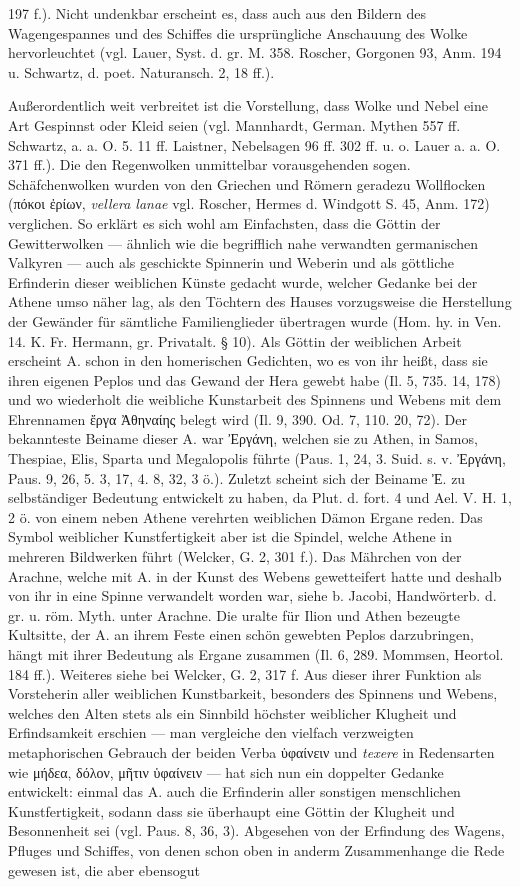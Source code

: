 \documentclass[a4paper, 11pt, oneside]{article}
\begin{document}
197 f.). Nicht undenkbar erscheint es, dass auch aus den Bildern des Wagengespannes und des Schiffes die ursprüngliche Anschauung des Wolke hervorleuchtet (vgl. Lauer, Syst. d. gr. M. 358. Roscher, Gorgonen 93, Anm. 194 u. Schwartz, d. poet. Naturansch. 2, 18 ff.).

Außerordentlich weit verbreitet ist die Vorstellung, dass Wolke und Nebel eine Art Gespinnst oder Kleid seien (vgl. Mannhardt, German. Mythen 557 ff. Schwartz, a. a. O. 5. 11 ff. Laistner, Nebelsagen 96 ff. 302 ff. u. o. Lauer a. a. O. 371 ff.). Die den Regenwolken unmittelbar vorausgehenden sogen. Schäfchenwolken wurden von den Griechen und Römern geradezu Wollflocken (πόκοι ἐρίων, \emph{vellera lanae} vgl. Roscher, Hermes d. Windgott S. 45, Anm. 172) verglichen. So erklärt es sich wohl am Einfachsten, dass die Göttin der Gewitterwolken --- ähnlich wie die begrifflich nahe verwandten germanischen Valkyren --- auch als geschickte Spinnerin und Weberin und als göttliche Erfinderin dieser weiblichen Künste gedacht wurde, welcher Gedanke bei der Athene umso näher lag, als den Töchtern des Hauses vorzugsweise die Herstellung der Gewänder für sämtliche Familienglieder übertragen wurde (Hom. hy. in Ven. 14. K. Fr. Hermann, gr. Privatalt. § 10). Als Göttin der weiblichen Arbeit erscheint A. schon in den homerischen Gedichten, wo es von ihr heißt, dass sie ihren eigenen Peplos und das Gewand der Hera gewebt habe (Il. 5, 735. 14, 178) und wo wiederholt die weibliche Kunstarbeit des Spinnens und Webens mit dem Ehrennamen ἔργα Ἀθηναίης belegt wird (Il. 9, 390. Od. 7, 110. 20, 72). Der bekannteste Beiname dieser A. war Ἐργάνη, welchen sie zu Athen, in Samos, Thespiae, Elis, Sparta und Megalopolis führte (Paus. 1, 24, 3. Suid. s. v. Ἐργάνη, Paus. 9, 26, 5. 3, 17, 4. 8, 32, 3 ö.). Zuletzt scheint sich der Beiname Ἐ. zu selbständiger Bedeutung entwickelt zu haben, da Plut. d. fort. 4 und Ael. V. H. 1, 2 ö. von einem neben Athene verehrten weiblichen Dämon Ergane reden. Das Symbol weiblicher Kunstfertigkeit aber ist die Spindel, welche Athene in mehreren Bildwerken führt (Welcker, G. 2, 301 f.). Das Mährchen von der Arachne, welche mit A. in der Kunst des Webens gewetteifert hatte und deshalb von ihr in eine Spinne verwandelt worden war, siehe b. Jacobi, Handwörterb. d. gr. u. röm. Myth. unter Arachne. Die uralte für Ilion und Athen bezeugte Kultsitte, der A. an ihrem Feste einen schön gewebten Peplos darzubringen, hängt mit ihrer Bedeutung als Ergane zusammen (Il. 6, 289. Mommsen, Heortol. 184 ff.). Weiteres siehe bei Welcker, G. 2, 317 f. Aus dieser ihrer Funktion als Vorsteherin aller weiblichen Kunstbarkeit, besonders des Spinnens und Webens, welches den Alten stets als ein Sinnbild höchster weiblicher Klugheit und Erfindsamkeit erschien --- man vergleiche den vielfach verzweigten metaphorischen Gebrauch der beiden Verba ὑφαίνειν und \emph{texere} in Redensarten wie μήδεα, δόλον, μῆτιν ὑφαίνειν --- hat sich nun ein doppelter Gedanke entwickelt: einmal das A. auch die Erfinderin aller sonstigen menschlichen Kunstfertigkeit, sodann dass sie überhaupt eine Göttin der Klugheit und Besonnenheit sei (vgl. Paus. 8, 36, 3). Abgesehen von der Erfindung des Wagens, Pfluges und Schiffes, von denen schon oben in anderm Zusammenhange die Rede gewesen ist, die aber ebensogut 
\end{document}
